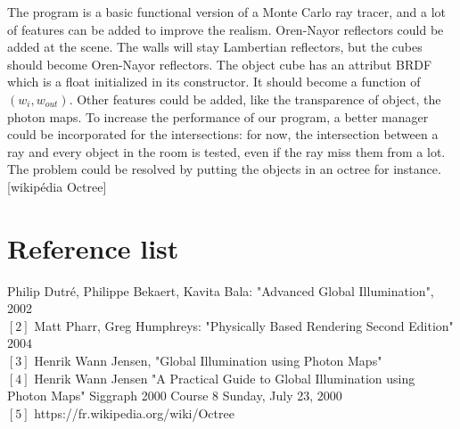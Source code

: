 \documentclass[12pt]{article}
\numberwithin{equation}{section}
\begin{document}
The program is a basic functional version of a Monte Carlo ray tracer, and a lot of features can be added to improve the realism. Oren-Nayor reflectors could be added at the scene. The walls will stay Lambertian reflectors, but the cubes should become Oren-Nayor reflectors. The object cube has an attribut BRDF which is a float initialized in its constructor. It should become a function of $(w_i, w_{out})$. Other features could be added, like the transparence of object, the photon maps. To increase the performance of our program, a better manager could be incorporated for the intersections: for now, the intersection between a ray and every object in the room is tested, even if the ray miss them from a lot. The problem could be resolved by putting the objects in an octree for instance.[wikipédia Octree] 


\section{Reference list}
\noindent [1] Philip Dutr\'e, Philippe Bekaert, Kavita Bala: "Advanced Global Illumination", 2002\\
$[2]$ Matt Pharr, Greg Humphreys: "Physically Based Rendering Second Edition" $2004$\\
$[3]$ Henrik Wann Jensen, "Global Illumination using Photon Maps" \\
$[4]$ Henrik Wann Jensen "A Practical Guide to Global Illumination using Photon Maps" Siggraph 2000 Course 8 Sunday, July 23, $2000$\\
$[5]$ https://fr.wikipedia.org/wiki/Octree\\



\nocite{*}


\end{document}
